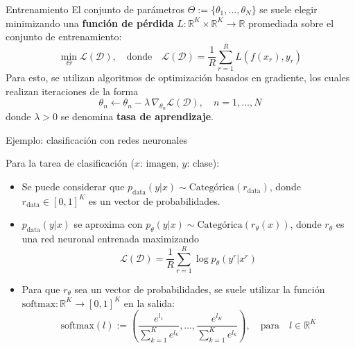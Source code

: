 \documentclass{beamer}
\newcommand{\R}{\mathbb{R}}
\begin{document}
\begin{frame}{Entrenamiento}
    El conjunto de parámetros $\Theta:=\{\theta_1,\ldots,\theta_N\}$ se suele elegir minimizando una \textbf{función de pérdida} $L:\R^K\times\R^K\to\R$ promediada sobre el conjunto de entrenamiento:
    \begin{equation*}
        \min_{\Theta}\mathcal{L}\left(\mathcal{D}\right),
        \quad\text{donde}\quad
        \mathcal{L}\left(\mathcal{D}\right)=\frac{1}{R}\sum_{r=1}^R L(f(x_r),y_r)
    \end{equation*}
    Para esto, se utilizan algoritmos de optimización basados en gradiente, los cuales realizan iteraciones de la forma
    \begin{equation*}
        \theta_n\leftarrow\theta_n - \lambda\,\nabla_{\theta_n} \mathcal{L}\left(\mathcal{D}\right),
        \quad n=1,\ldots,N
    \end{equation*}
    donde $\lambda>0$ se denomina \textbf{tasa de aprendizaje}.
\end{frame}


\begin{frame}{Ejemplo: clasificación con redes neuronales}

    Para la tarea de clasificación ($x$: imagen, $y$: clase):

    \begin{itemize}
        \item Se puede considerar que $p_\text{data}(y|x)\sim\text{Categórica}(r_\text{data})$, donde $r_\text{data}\in[0,1]^K$ es un vector de probabilidades.
        \item $p_\text{data}(y|x)$ se aproxima con $p_\theta(y|x)\sim\text{Categórica}(r_\theta(x))$, donde $r_\theta$ es una red neuronal entrenada maximizando
              \begin{equation*}
                  \mathcal{L}\left(\mathcal{D}\right)=\frac{1}{R}\sum_{r=1}^R \log p_\theta(y^r|x^r)
              \end{equation*}
        \item Para que $r_\theta$ sea un vector de probabilidades, se suele utilizar la función $\text{softmax}:\R^K\to[0,1]^K$ en la salida:
              \begin{equation*}
                  \text{softmax}(l):=\left(\frac{e^{l_1}}{\sum_{k=1}^K e^{l_k}}, \ldots,\frac{e^{l_K}}{\sum_{k=1}^K e^{l_k}}\right),
                  \quad\text{para}\quad l\in\R^K
              \end{equation*}
    \end{itemize}
\end{frame}
\end{document}
